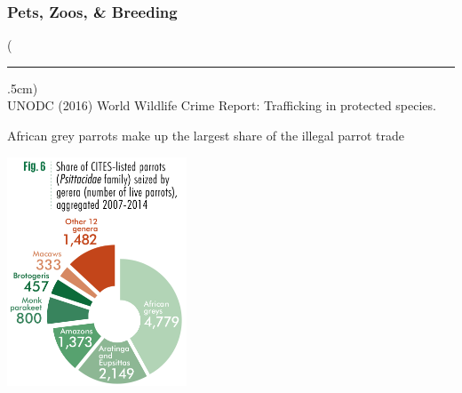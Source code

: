 \documentclass[10pt]{beamer}
\newenvironment{reference}[2]{%
	\begin{textblock*}{\textwidth}(#1,#2)
		\tiny\bgroup\color{gray}}{\egroup\end{textblock*}}
\begin{document}
\begin{frame}[t]
\frametitle{Pets, Zoos, \& Breeding}
\vspace{0.5cm}

	\begin{reference}{4mm}{92mm}
		\rule{1.5cm}{0.25pt}\\
		UNODC (2016) World Wildlife Crime Report: Trafficking in protected species.
	\end{reference}
	
	African grey parrots make up the largest share of the illegal parrot trade
	
	\vspace{0.25cm}
	
		\begin{center}
			\includegraphics[width=0.4\textwidth]{figures/parrot_percentages.png}
		\end{center}
\end{frame}	
\end{document}
